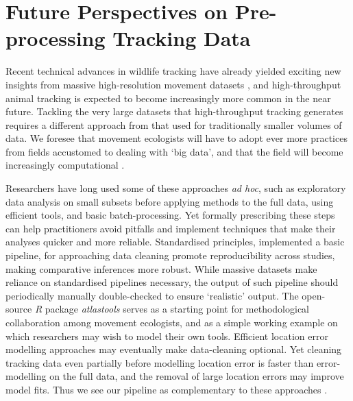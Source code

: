 \section*{Future Perspectives on Pre-processing Tracking Data}

Recent technical advances in wildlife tracking have already yielded exciting new insights from massive high-resolution movement datasets \citep{aspillaga2021, aspillaga2021a, baktoft2017, baktoft2019, harel2016, harel2018, oudman2018, papageorgiou2019, tsoar2011, strandburg-peshkin2015, toledo2020, beardsworth2021a, beardsworth2021b, corl2020, vilk2021, lourie2021}, and high-throughput animal tracking is expected to become increasingly more common in the near future.
Tackling the very large datasets that high-throughput tracking generates requires a different approach from that used for traditionally smaller volumes of data.
We foresee that movement ecologists will have to adopt ever more practices from fields accustomed to dealing with `big data', and that the field will become increasingly computational \citep{peng2011}.

Researchers have long used some of these approaches \textit{ad hoc}, such as exploratory data analysis on small subsets before applying methods to the full data, using efficient tools, and basic batch-processing. 
Yet formally prescribing these steps can help practitioners avoid pitfalls and implement techniques that make their analyses quicker and more reliable.
Standardised principles, implemented a basic pipeline, for approaching data cleaning promote reproducibility across studies, making comparative inferences more robust.
While massive datasets make reliance on standardised pipelines necessary, the output of such pipeline should periodically manually double-checked to ensure `realistic' output.
The open-source \textit{R} package \textit{atlastools} serves as a starting point for methodological collaboration among movement ecologists, and as a simple working example on which researchers may wish to model their own tools.
Efficient location error modelling approaches \citep{fleming2020, aspillaga2021} may eventually make data-cleaning optional.
Yet cleaning tracking data even partially before modelling location error is faster than error-modelling on the full data, and the removal of large location errors may improve model fits.
Thus we see our pipeline as complementary to these approaches \citep{fleming2014, fleming2020}.

